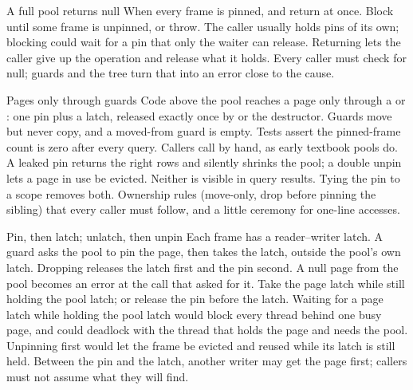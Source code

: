 \begin{decision}{A full pool returns null}
 When every frame is pinned,  and
 return  at once.
 Block until some frame is unpinned, or throw.
 The caller usually holds pins of its own; blocking could wait for
a pin that only the waiter can release. Returning lets the caller give up the
operation and release what it holds.
 Every caller must check for null; guards and the tree turn that
into an error close to the cause.
\end{decision}

\begin{decision}{Pages only through guards}
 Code above the pool reaches a page only through a
 or : one pin plus a latch, released
exactly once by  or the destructor. Guards move but never copy, and a
moved-from guard is empty. Tests assert the pinned-frame count is zero after
every query.
 Callers call  by hand, as early textbook
pools do.
 A leaked pin returns the right rows and silently shrinks the pool;
a double unpin lets a page in use be evicted. Neither is visible in query
results. Tying the pin to a scope removes both.
 Ownership rules (move-only, drop before pinning the sibling) that
every caller must follow, and a little ceremony for one-line accesses.
\end{decision}

\begin{decision}{Pin, then latch; unlatch, then unpin}
 Each frame has a reader--writer latch. A guard asks the pool to
pin the page, then takes the latch, outside the pool's own latch. Dropping
releases the latch first and the pin second. A null page from the pool becomes
an error at the call that asked for it.
 Take the page latch while still holding the pool latch;
or release the pin before the latch.
 Waiting for a page latch while holding the pool latch would block
every thread behind one busy page, and could deadlock with the thread that
holds the page and needs the pool. Unpinning first would let the frame be
evicted and reused while its latch is still held.
 Between the pin and the latch, another writer may get the page
first; callers must not assume what they will find.
\end{decision}

